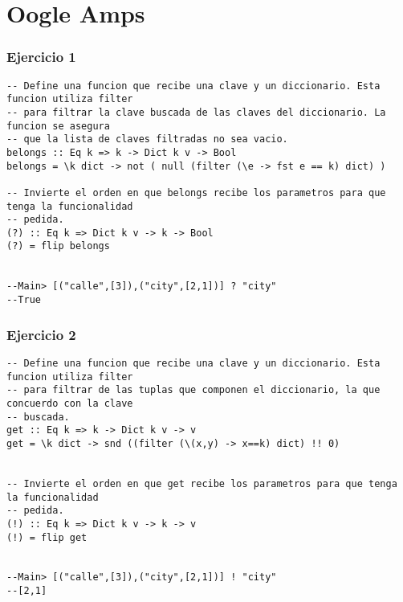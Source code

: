 \section*{Oogle Amps}


\subsubsection*{Ejercicio 1}
\begin{lstlisting}
-- Define una funcion que recibe una clave y un diccionario. Esta funcion utiliza filter
-- para filtrar la clave buscada de las claves del diccionario. La funcion se asegura
-- que la lista de claves filtradas no sea vacio.
belongs :: Eq k => k -> Dict k v -> Bool
belongs = \k dict -> not ( null (filter (\e -> fst e == k) dict) )

-- Invierte el orden en que belongs recibe los parametros para que tenga la funcionalidad
-- pedida.
(?) :: Eq k => Dict k v -> k -> Bool
(?) = flip belongs 


--Main> [("calle",[3]),("city",[2,1])] ? "city" 
--True
\end{lstlisting}
\vspace{1cm}

\subsubsection*{Ejercicio 2}
\begin{lstlisting}
-- Define una funcion que recibe una clave y un diccionario. Esta funcion utiliza filter
-- para filtrar de las tuplas que componen el diccionario, la que concuerdo con la clave
-- buscada.
get :: Eq k => k -> Dict k v -> v
get = \k dict -> snd ((filter (\(x,y) -> x==k) dict) !! 0)


-- Invierte el orden en que get recibe los parametros para que tenga la funcionalidad
-- pedida.
(!) :: Eq k => Dict k v -> k -> v
(!) = flip get


--Main> [("calle",[3]),("city",[2,1])] ! "city" 
--[2,1]
\end{lstlisting}
\vspace{1cm}

